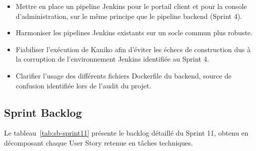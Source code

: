 \begin{itemize}
    \item Mettre en place un pipeline Jenkins pour le portail client et pour la console d'administration, sur le même principe que le pipeline backend (Sprint 4).
    \item Harmoniser les pipelines Jenkins existants sur un socle commun plus robuste.
    \item Fiabiliser l'exécution de Kaniko afin d'éviter les échecs de construction dus à la corruption de l'environnement Jenkins identifiée au Sprint 4.
    \item Clarifier l'usage des différents fichiers Dockerfile du backend, source de confusion identifiée lors de l'audit du projet.
\end{itemize}

\subsection{Sprint Backlog}

Le tableau~\ref{tab:sb-sprint11} présente le backlog détaillé du Sprint 11, obtenu en décomposant chaque User Story retenue en tâches techniques.

